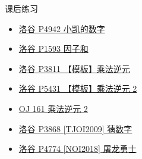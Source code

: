 \begin{frame}[fragile]{课后练习}
	\begin{itemize}
		\item \href{https://www.luogu.com.cn/problem/P4942}{洛谷 P4942 小凯的数字}
		\item \href{https://www.luogu.com.cn/problem/P1593}{洛谷 P1593 因子和}
		\item \href{https://www.luogu.com.cn/problem/P3811}{洛谷 P3811 【模板】乘法逆元}
		\item \href{https://www.luogu.com.cn/problem/P5431}{洛谷 P5431 【模板】乘法逆元 2}
		\item \href{https://loj.ac/problem/161}{OJ 161 乘法逆元 2}
		\item \href{https://www.luogu.com.cn/problem/P3868}{洛谷 P3868 [TJOI2009] 猜数字}
		\item \href{https://www.luogu.com.cn/problem/P4774}{洛谷 P4774 [NOI2018] 屠龙勇士}
	\end{itemize}
\end{frame}
